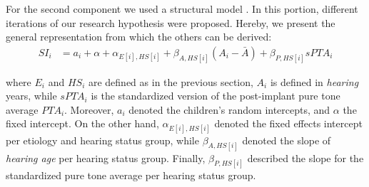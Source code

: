 For the second component we used a structural model \cite{Hoyle_et_al_2014}. In this portion, different iterations of our research hypothesis were proposed. Hereby, we present the general representation from which the others can be derived:
%
\begin{align}
	SI_{i} & = a_{i} + \alpha + \alpha_{E[i], HS[i]} + \beta_{A, HS[i]} (A_{i} - \bar{A}) + \beta_{P, HS[i]} sPTA_{i} 
\end{align}

\noindent where $E_{i}$ and $HS_{i}$ are defined as in the previous section, $A_{i}$ is defined in \textit{hearing} years, while $sPTA_{i}$ is the standardized version of the post-implant pure tone average $PTA_{i}$. Moreover, $a_{i}$ denoted the children's random intercepts, and $\alpha$ the fixed intercept. On the other hand,  $\alpha_{E[i],HS[i]}$ denoted the fixed effects intercept per etiology and hearing status group, while $\beta_{A, HS[i]}$ denoted the slope of \textit{hearing age} per hearing status group. Finally, $\beta_{P, HS[i]}$ described the slope for the standardized pure tone average per hearing status group. 

